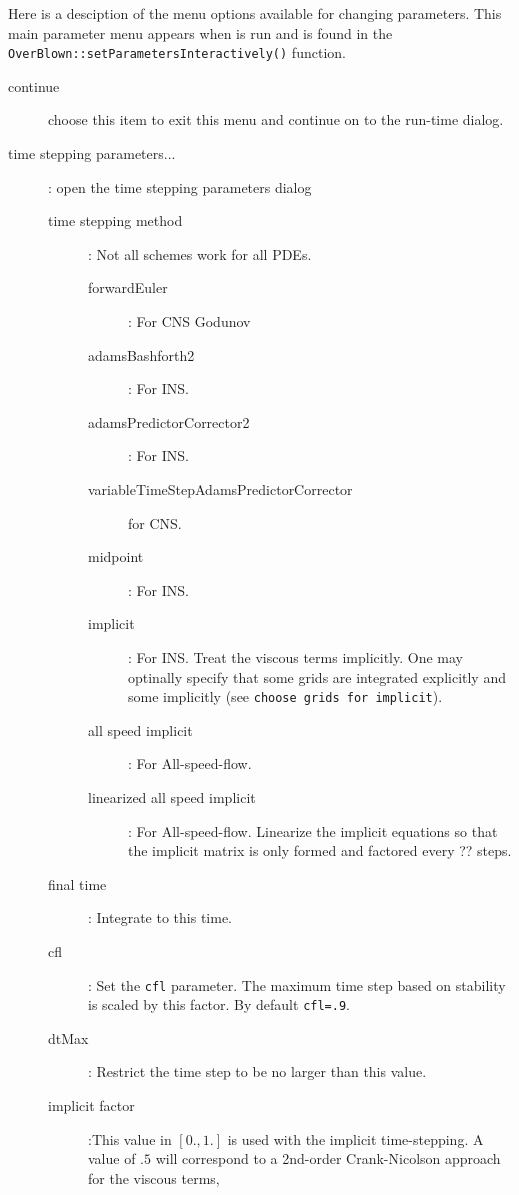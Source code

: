 
 
\newlength{\setParametersIncludeArgIndent}

 Here is a desciption of the menu options available for changing parameters. This main parameter menu appears
 when \OverBlown is run and is found in the {\tt OverBlown::\-set\-Parameters\-Interactively()} function.
\begin{description}
  \item[continue] choose this item to exit this menu and continue on to the run-time dialog.
  \item[time stepping parameters...] : open the time stepping parameters dialog
    \begin{description}
      \item[time stepping method] : Not all schemes work for all PDEs. 
        \begin{description}
          \item[forwardEuler] : For CNS Godunov
          \item[adamsBashforth2] : For INS.
          \item[adamsPredictorCorrector2] : For INS.
          \item[variableTimeStepAdamsPredictorCorrector] for CNS.
          \item[midpoint] : For INS.
          \item[implicit] : For INS. Treat the viscous terms implicitly. One may optinally specify that some
             grids are integrated explicitly and some implicitly (see {\tt choose grids for implicit}).
          \item[all speed implicit] : For All-speed-flow.
          \item[linearized all speed implicit] :  For All-speed-flow. Linearize the implicit equations so that
             the implicit matrix is only formed and factored every ?? steps.
        \end{description}
      \item[final time] : Integrate to this time.
      \item[cfl] : Set the {\tt cfl} parameter. 
         The maximum time step based on stability is scaled by this factor.
         By default {\tt cfl=.9}. 
      \item[dtMax] : Restrict the time step to be no larger than this value.
      \item[implicit factor] :This value in $[0.,1.]$ is used with the implicit time-stepping. A value
         of $.5$ will correspond to a 2nd-order Crank-Nicolson approach for the viscous terms,

\end{description}
\end{description}
